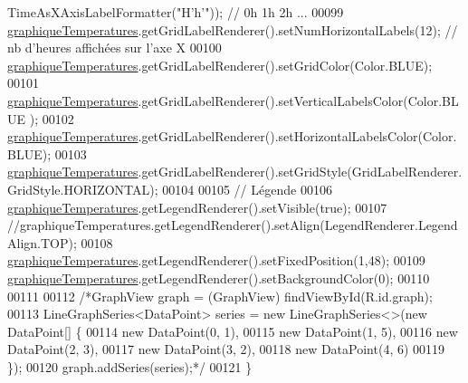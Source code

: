 \begin{DoxyCode}
      TimeAsXAxisLabelFormatter(\textcolor{stringliteral}{"H'h'"})); \textcolor{comment}{// 0h 1h 2h ...}
00099         \hyperlink{classfr_1_1campus_1_1laurainc_1_1honeybee_1_1_graph_activity_ab266262244788c2878b8f1b0587ae5ad}{graphiqueTemperatures}.getGridLabelRenderer().setNumHorizontalLabels(12); \textcolor{comment}{// nb
       d'heures affichées sur l'axe X}
00100         \hyperlink{classfr_1_1campus_1_1laurainc_1_1honeybee_1_1_graph_activity_ab266262244788c2878b8f1b0587ae5ad}{graphiqueTemperatures}.getGridLabelRenderer().setGridColor(Color.BLUE);
00101         \hyperlink{classfr_1_1campus_1_1laurainc_1_1honeybee_1_1_graph_activity_ab266262244788c2878b8f1b0587ae5ad}{graphiqueTemperatures}.getGridLabelRenderer().setVerticalLabelsColor(Color.BLUE
      );
00102         \hyperlink{classfr_1_1campus_1_1laurainc_1_1honeybee_1_1_graph_activity_ab266262244788c2878b8f1b0587ae5ad}{graphiqueTemperatures}.getGridLabelRenderer().setHorizontalLabelsColor(Color.
      BLUE);
00103         \hyperlink{classfr_1_1campus_1_1laurainc_1_1honeybee_1_1_graph_activity_ab266262244788c2878b8f1b0587ae5ad}{graphiqueTemperatures}.getGridLabelRenderer().setGridStyle(GridLabelRenderer.
      GridStyle.HORIZONTAL);
00104 
00105         \textcolor{comment}{// Légende}
00106         \hyperlink{classfr_1_1campus_1_1laurainc_1_1honeybee_1_1_graph_activity_ab266262244788c2878b8f1b0587ae5ad}{graphiqueTemperatures}.getLegendRenderer().setVisible(\textcolor{keyword}{true});
00107         \textcolor{comment}{//graphiqueTemperatures.getLegendRenderer().setAlign(LegendRenderer.LegendAlign.TOP);}
00108         \hyperlink{classfr_1_1campus_1_1laurainc_1_1honeybee_1_1_graph_activity_ab266262244788c2878b8f1b0587ae5ad}{graphiqueTemperatures}.getLegendRenderer().setFixedPosition(1,48);
00109         \hyperlink{classfr_1_1campus_1_1laurainc_1_1honeybee_1_1_graph_activity_ab266262244788c2878b8f1b0587ae5ad}{graphiqueTemperatures}.getLegendRenderer().setBackgroundColor(0);
00110 
00111 
00112         \textcolor{comment}{/*GraphView graph = (GraphView) findViewById(R.id.graph);
}
00113 \textcolor{comment}{        LineGraphSeries<DataPoint> series = new LineGraphSeries<>(new DataPoint[] \{
}
00114 \textcolor{comment}{                new DataPoint(0, 1),
}
00115 \textcolor{comment}{                new DataPoint(1, 5),
}
00116 \textcolor{comment}{                new DataPoint(2, 3),
}
00117 \textcolor{comment}{                new DataPoint(3, 2),
}
00118 \textcolor{comment}{                new DataPoint(4, 6)
}
00119 \textcolor{comment}{        \});
}
00120 \textcolor{comment}{        graph.addSeries(series);*/}
00121     \}
\end{DoxyCode}


